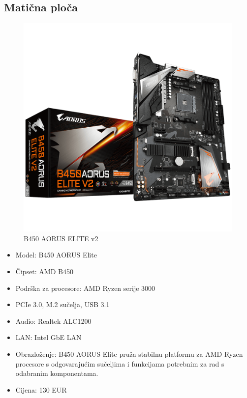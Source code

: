 \documentclass{article}
\begin{document}
\subsection{Matična ploča}
\begin{figure}[H]
    \centering
    \includegraphics[scale=0.1]{Slike/Maticna.jpg}
    \caption{B450 AORUS ELITE v2}
    \label{fig:Matična}
\end{figure}
\begin{itemize}
    \item Model: B450 AORUS Elite
    \item Čipset: AMD B450
    \item Podrška za procesore: AMD Ryzen serije 3000
    \item PCIe 3.0, M.2 sučelja, USB 3.1
    \item Audio: Realtek ALC1200
    \item LAN: Intel GbE LAN
    \item Obrazloženje: B450 AORUS Elite pruža stabilnu platformu za AMD Ryzen procesore s odgovarajućim sučeljima i funkcijama potrebnim za rad s odabranim komponentama.
    \item Cijena: 130 EUR 
\end{itemize}
\end{document}
